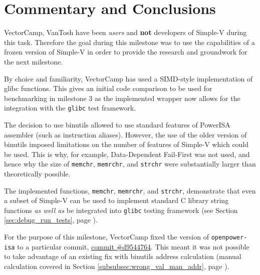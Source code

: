 \chapter{Commentary and Conclusions}

VectorCamp, VanTosh have been \textit{users} and \textbf{not} developers
of Simple-V during this task.
Therefore the goal during this milestone was to use the capabilities of a
frozen version of Simple-V in order to provide the research and
groundwork for the next milestone.

By choice and familiarity, VectorCamp has used a SIMD-style
implementation of glibc functions. This gives an initial code
comparison to be used for benchmarking in milestone 3 as the implemented
wrapper now allows for the integration with the \texttt{glibc} test framework.

The decision to use binutils allowed to use standard features of
PowerISA assembler (such as instruction aliases).
However, the use of the older version of binutils imposed limitations
on the number of features of
Simple-V which could be used. This is why, for example,
Data-Dependent Fail-First was not used, and hence why the size of
\texttt{memchr}, \texttt{memrchr}, and \texttt{strchr} were
substantially larger than theoretically possible.

The implemented functions, \texttt{memchr}, \texttt{memrchr},
and \texttt{strchr}, demonstrate that even a subset of Simple-V can be used
to implement standard C library string functions \textit{as well as} be
integrated into \texttt{glibc} testing framework
(see Section \ref{sec:debug_run_tests}, page \pageref{sec:debug_run_tests}).

For the purpose of this milestone, VectorCamp fixed the version of
\texttt{openpower-isa} to a particular commit,
\href{https://git.libre-soc.org/?p=openpower-isa.git;a=commitdiff;h=d9544764b1710f3807a9c0685d150a665f70b9a2}{commit \#d9544764}.
This meant it was not possible to take advantage of an existing fix
with binutils address calculation (manual calculation covered in Section
\ref{subsubsec:wrong_val_man_addr},
page \pageref{subsubsec:wrong_val_man_addr}).
